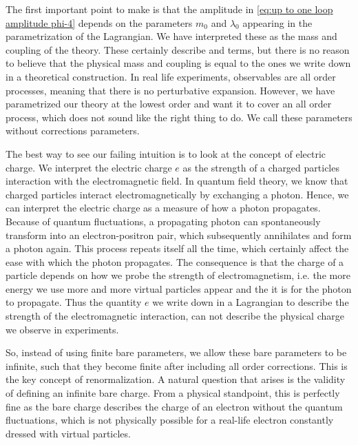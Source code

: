The first important point to make is that the amplitude in \cref{eq:up to one loop amplitude phi-4} depends on the parameters $m_0$ and $\lambda_0$ appearing in the parametrization of the Lagrangian. We have interpreted these as the mass and coupling of the theory. These certainly describe  and  terms, but there is no reason to believe that the physical mass and coupling is equal to the ones we write down in a theoretical construction. In real life experiments, observables are all order processes, meaning that there is no perturbative expansion. However, we have parametrized our theory at the lowest order and want it to cover an all order process, which does not sound like the right thing to do. We call these parameters without corrections  parameters.

The best way to see our failing intuition is to look at the concept of electric charge. We interpret the electric charge $e$ as the strength of a charged particles interaction with the electromagnetic field. In quantum field theory, we know that charged particles interact electromagnetically by exchanging a photon. Hence, we can interpret the electric charge as a measure of how  a photon propagates. Because of quantum fluctuations, a propagating photon can spontaneously transform into an electron-positron pair, which subsequently annihilates and form a photon again. This process repeats itself all the time, which certainly affect the ease with which the photon propagates. The consequence is that the charge of a particle depends on how  we probe the strength of electromagnetism, i.e. the more energy we use more and more virtual particles appear and the  it is for the photon to propagate. Thus the quantity $e$ we write down in a Lagrangian to describe the strength of the electromagnetic interaction, can not describe the physical charge we observe in experiments.

So, instead of using finite bare parameters, we allow these bare parameters to be infinite, such that they become finite after including all order corrections. This is the key concept of renormalization. A natural question that arises is the validity of defining an infinite bare charge. From a physical standpoint, this is perfectly fine as the bare charge describes the charge of an electron without the quantum fluctuations, which is not physically possible for a real-life electron constantly dressed with virtual particles.  

